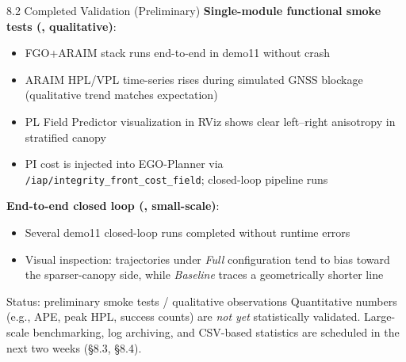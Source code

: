 \documentclass[10pt,aspectratio=169,xcolor=dvipsnames]{beamer}
\newcommand{\1}{\mathbb{1}}
\begin{document}
\begin{frame}{8.2 Completed Validation (Preliminary)}
  \small
  \textbf{Single-module functional smoke tests (\checkmark, qualitative)}:
  \begin{itemize}\scriptsize
    \item FGO+ARAIM stack runs end-to-end in demo11 without crash
    \item ARAIM HPL/VPL time-series rises during simulated GNSS blockage (qualitative trend matches expectation)
    \item PL Field Predictor visualization in RViz shows clear left--right anisotropy in stratified canopy
    \item PI cost is injected into EGO-Planner via \texttt{/iap/integrity\_front\_cost\_field}; closed-loop pipeline runs
  \end{itemize}

  \medskip
  \textbf{End-to-end closed loop (\checkmark, small-scale)}:
  \begin{itemize}\scriptsize
    \item Several demo11 closed-loop runs completed without runtime errors
    \item Visual inspection: trajectories under \emph{Full} configuration tend to bias toward the sparser-canopy side, while \emph{Baseline} traces a geometrically shorter line
  \end{itemize}

  \medskip
  \begin{alertblock}{\small Status: preliminary smoke tests / qualitative observations}
    \scriptsize
    Quantitative numbers (e.g., APE, peak HPL, success counts) are \emph{not yet} statistically validated. Large-scale benchmarking, log archiving, and CSV-based statistics are scheduled in the next two weeks (\S8.3, \S8.4).
  \end{alertblock}
\end{frame}
\end{document}
